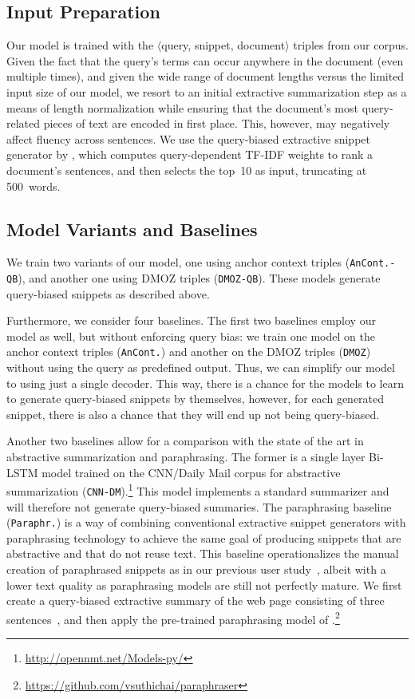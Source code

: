 \documentclass[sigconf]{acmart}
\begin{document}
\subsection{Input Preparation}

Our model is trained with the $\langle$query, snippet, document$\rangle$ triples from our corpus. Given the fact that the query's terms can occur anywhere in the document (even multiple times), and given the wide range of document lengths versus the limited input size of our model, we resort to an initial extractive summarization step as a means of length normalization while ensuring that the document's most query-related pieces of text are encoded in first place. This, however, may negatively affect fluency across sentences. We use the query-biased extractive snippet generator by \citet{liu:2018}, which computes query-dependent TF-IDF weights to rank a document's sentences, and then selects the top~10 as input, truncating at 500~words.

\subsection{Model Variants and Baselines}

We train two variants of our model, one using anchor context triples ({\small\tt AnCont.-QB}), and another one using DMOZ triples ({\small\tt DMOZ-QB}). These models generate query-biased snippets as described above.

Furthermore, we consider four baselines. The first two baselines employ our model as well, but without enforcing query bias: we train one model on the anchor context triples ({\small\tt AnCont.}) and another on the DMOZ triples ({\small\tt DMOZ}) without using the query as predefined output. Thus, we can simplify our model to using just a single decoder. This way, there is a chance for the models to learn to generate query-biased snippets by themselves, however, for each generated snippet, there is also a chance that they will end up not being query-biased.

Another two baselines allow for a comparison with the state of the art in abstractive summarization and paraphrasing. The former is a single layer Bi-LSTM model trained on the CNN/Daily Mail corpus for abstractive summarization ({\small\tt CNN-DM}).\footnote{\url{http://opennmt.net/Models-py/}}
This model implements a standard summarizer and will therefore not generate query-biased summaries. The paraphrasing baseline ({\small\tt Paraphr.}) is a way of combining conventional extractive snippet generators with paraphrasing technology to achieve the same goal of producing snippets that are abstractive and that do not reuse text. This baseline operationalizes the manual creation of paraphrased snippets as in our previous user study~\cite{stein:2018k}, albeit with a lower text quality as paraphrasing models are still not perfectly mature. We first create a query-biased extractive summary of the web page consisting of three sentences~\cite{liu:2018}, and then apply the pre-trained paraphrasing model of \citet{wieting:2017}.\footnote{\url{https://github.com/vsuthichai/paraphraser}}
\end{document}
